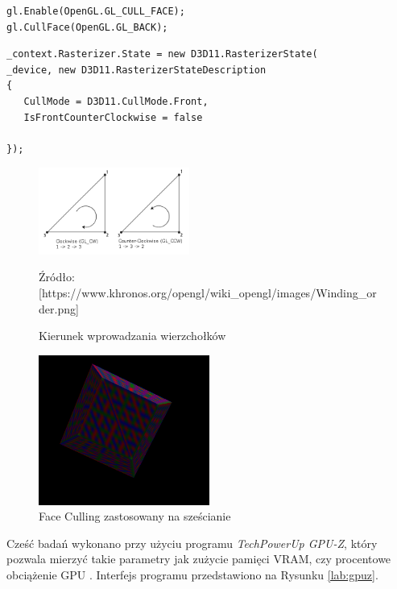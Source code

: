 \documentclass[archive]{mgr}
\begin{document}
\begin{lstlisting}[caption={OpenGL – Face Culling},captionpos=b,label={lab:faceculling}]
gl.Enable(OpenGL.GL_CULL_FACE);
gl.CullFace(OpenGL.GL_BACK);

\end{lstlisting}
\begin{lstlisting}[caption={DirectX – Face Culling},captionpos=b,label={lab:faceculling2}]
_context.Rasterizer.State = new D3D11.RasterizerState(
_device, new D3D11.RasterizerStateDescription
{
   CullMode = D3D11.CullMode.Front,
   IsFrontCounterClockwise = false

});

\end{lstlisting}
\begin{figure}[h!]
  \centering
    \includegraphics[width=0.44\textwidth]{images/Winding_order.png}
   \caption{Kierunek wprowadzania wierzchołków}
   Źródło: [https://www.khronos.org/opengl/wiki\_opengl/images/Winding\_order.png]
   \label{lab:wind}
\end{figure}
\begin{figure}[h!]
  \centering
    \includegraphics[width=0.5\textwidth]{images/cull.png}
   \caption{Face Culling zastosowany na sześcianie}
   \label{lab:culpic}
\end{figure}

Cześć badań wykonano przy użyciu programu \emph{TechPowerUp GPU-Z}, który pozwala mierzyć takie parametry jak zużycie pamięci VRAM, czy procentowe obciążenie GPU \cite{gpuz}. Interfejs programu przedstawiono na Rysunku \ref{lab:gpuz}.
\end{document}
